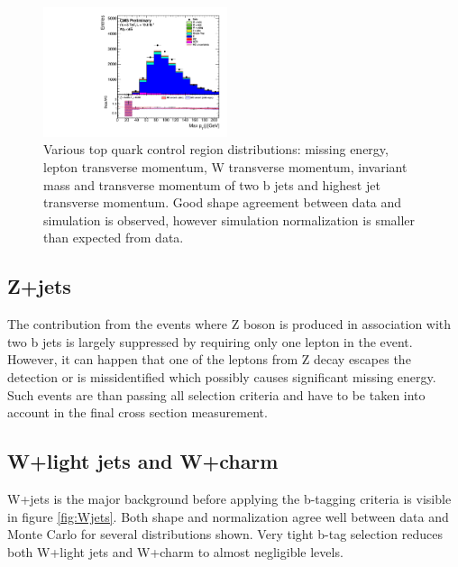 \begin{figure}[htbp]
		\includegraphics[width=0.48\textwidth]{Figures/Results/Muon/prefit/TT_max_hJet_pt_doQCD1.pdf}		
	\caption[Top quark control region]{Various top quark control region distributions: missing energy, lepton transverse momentum, W transverse momentum, invariant mass and transverse momentum of two b jets and highest jet transverse momentum. Good shape agreement between data and simulation is observed, however simulation normalization is smaller than expected from data.}
	\label{fig:TT_CR}
\end{figure}

\subsection{Z+jets}

The contribution from the events where Z boson is produced in association with two b jets is largely suppressed by requiring only one lepton in the event. However, it can happen that one of the leptons from Z decay escapes the detection or is missidentified which possibly causes significant missing energy. Such events are than passing all selection criteria and have to be taken into account in the final cross section measurement. 

\subsection{W+light jets and W+charm}

W+jets is the major background before applying the b-tagging criteria is visible in figure \ref{fig:Wjets}. Both shape and normalization agree well between data and Monte Carlo for several distributions shown. Very tight b-tag selection reduces both W+light jets and W+charm to almost negligible levels.  

